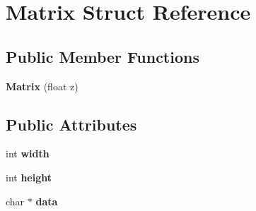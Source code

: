 \hypertarget{classMatrix}{}\section{Matrix Struct Reference}
\label{classMatrix}
\subsection*{Public Member Functions}
\begin{DoxyCompactItemize}
\item 
\hypertarget{classMatrix_adc4c5123f4cf8d1c3c71201e789d4022}{}{\bfseries Matrix} (float z)\label{classMatrix_adc4c5123f4cf8d1c3c71201e789d4022}

\end{DoxyCompactItemize}
\subsection*{Public Attributes}
\begin{DoxyCompactItemize}
\item 
\hypertarget{classMatrix_ad4320bd2dc03fd11887d3ba350c6c8ef}{}int {\bfseries width}\label{classMatrix_ad4320bd2dc03fd11887d3ba350c6c8ef}

\item 
\hypertarget{classMatrix_a0b5614256a04ece0ea54b8aad7e6980c}{}int {\bfseries height}\label{classMatrix_a0b5614256a04ece0ea54b8aad7e6980c}

\item 
\hypertarget{classMatrix_a3b7bddfbeedc817c6eefd960fcb079f0}{}char $\ast$ {\bfseries data}\label{classMatrix_a3b7bddfbeedc817c6eefd960fcb079f0}

\end{DoxyCompactItemize}

